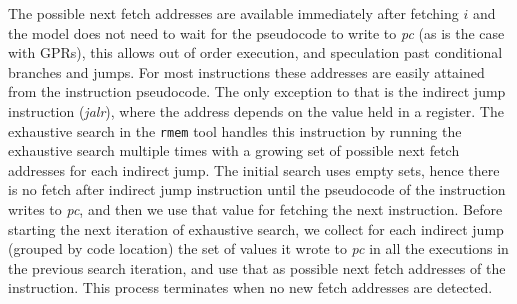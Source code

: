 \begin{commentary}
The possible next fetch addresses are available immediately after fetching $i$ and the model does not need to wait for the pseudocode to write to {\em pc} (as is the case with GPRs), this allows out of order execution, and speculation past conditional branches and jumps.
For most instructions these addresses are easily attained from the instruction pseudocode.
The only exception to that is the indirect jump instruction ({\em jalr}), where the address depends on the value held in a register.
%
The exhaustive search in the {\tt rmem} tool handles this instruction by running the exhaustive search multiple times with a growing set of possible next fetch addresses for each indirect jump.
The initial search uses empty sets, hence there is no fetch after indirect jump instruction until the pseudocode of the instruction writes to {\em pc}, and then we use that value for fetching the next instruction.
Before starting the next iteration of exhaustive search, we collect for each indirect jump (grouped by code location) the set of values it wrote to {\em pc} in all the executions in the previous search iteration, and use that as possible next fetch addresses of the instruction.
This process terminates when no new fetch addresses are detected.
\end{commentary}

